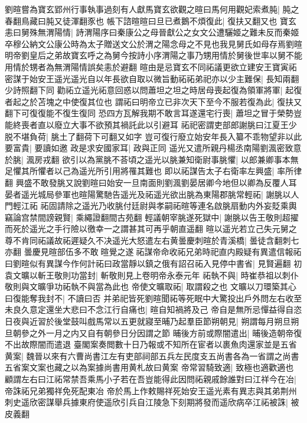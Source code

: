 劉暄嘗為寶玄郢州行事執事過刻有人獻馬寶玄欲觀之暄曰馬何用觀妃索煮肫|{
	肫之春翻鳥藏曰肫又徒渾翻豕也}
帳下諮暄暄曰旦已煮鵝不煩復此|{
	復扶又翻又也}
寶玄恚曰舅殊無渭陽情|{
	詩渭陽序曰秦康公之母晉獻公之女文公遭驪姬之難未反而秦姬卒穆公納文公康公時為太子贈送文公於渭之陽念母之不見也我見舅氏如母存焉劉暄明帝劉皇后之弟故寶玄呼之為舅今按詩小序渭陽之事乃甥用情於舅後世率以舅不能用情於甥者為無渭陽情誤矣恚於避翻}
暄由是忌寶玄不同祏議更欲立建安王寶寅祏密謀于始安王遥光遥光自以年長欲自取以微旨動祏祏弟祀亦以少主難保|{
	長知兩翻少詩照翻下同}
勸祏立遥光祏意回惑以問蕭坦之坦之時居母喪起復為領軍將軍|{
	起復者起之於苫塊之中使復其位也}
謂祏曰明帝立已非次天下至今不服若復為此|{
	復扶又翻下可復復能不復生復同}
恐四方瓦解我期不敢言耳遂還宅行喪|{
	蕭坦之冒于榮勢豈能終喪者直以廢立大事不欲預其禍託此以引避耳}
祏祀密謂吏部郎謝朓曰江夏王少脱不堪負荷|{
	朓土了翻荷下可翻又如字}
豈可復行廢立始安年長入纂不乖物望非以此要富貴|{
	要讀如邀}
政是求安國家耳|{
	政與正同}
遥光又遣所親丹楊丞南陽劉渢密致意於朓|{
	渢房戎翻}
欲引以為黨朓不荅頃之遥光以脁兼知衛尉事脁懼|{
	以郎兼卿事本無足懼其所懼者以己為遥光所引用將罹其難也}
即以祏謀告太子右衛率左興盛|{
	率所律翻}
興盛不敢發朓又說劉暄曰始安一旦南面則劉渢劉晏居卿今地但以卿為反覆人耳晏者遥光城局參軍也暄陽驚馳告遥光及祏遥光欲出脁為東陽郡脁常輕祏|{
	謝朓以人門輕江祏}
祏固請除之遥光乃收朓付廷尉與孝嗣祏暄等連名啟朓扇動内外妄貶乘輿竊論宫禁間謗親賢|{
	乘繩證翻間古苑翻}
輕議朝宰朓遂死獄中|{
	謝朓以告王敬則超擢而死於遥光之手行險以徼幸一之謂甚其可再乎朝直遥翻}
暄以遥光若立己失元舅之尊不肯同祏議故祏遲疑久不决遥光大怒遣左右黄曇慶刺暄於青溪橋|{
	曇徒含翻刺七亦翻}
曇慶見暄部伍多不敢暄覺之遂祏謀帝命收祏兄弟時祀直内殿疑有異遣信報祏曰劉暄似有異謀今作何計祏曰政當靜以鎮之俄有詔召祏入見停中書省|{
	見賢遍翻}
初袁文曠以斬王敬則功當封|{
	斬敬則見上卷明帝永泰元年}
祏執不與|{
	時崔恭祖以刺仆敬則與文曠爭功祏執不與當為此也}
帝使文曠取祏|{
	取謂殺之也}
文曠以刀環築其心曰復能奪我封不|{
	不讀曰否}
并弟祀皆死劉暄聞祏等死眠中大驚投出戶外問左右收至未良久意定還坐大悲曰不念江行自痛也|{
	暄自知禍將及己}
帝自是無所忌憚益得自恣日夜與近習於後堂鼓叫戲馬常以五更就寢至晡乃起羣臣節朔朝見|{
	朔謂每月朔旦朔旦朝參之外一月之内又自有朝參日分因謂之節}
晡後方前或際闇遣出|{
	晡後造朝帝復不出故際闇而遣退}
臺閣案奏閲數十日乃報或不知所在宦者以裹魚肉還家並是五省黄案|{
	魏晉以來有六曹尚書江左有吏部祠部五兵左民度支五尚書各為一省謂之尚書五省案文案也藏之以為案據尚書用黄札故曰黄案}
帝常習騎致適|{
	致極也適歡適也}
顧謂左右曰江祏常禁吾乘馬小子若在吾豈能得此因問祏親戚餘誰對曰江祥今在冶|{
	帝誅祏兄弟獨祥免死配東冶}
帝於馬上作敕賜祥死始安王遥光素有異志與其弟荆州刺史遥欣密謀舉兵據東府使遥欣引兵自江陵急下刻期將發而遥欣病卒江祏被誅|{
	被皮義翻}

